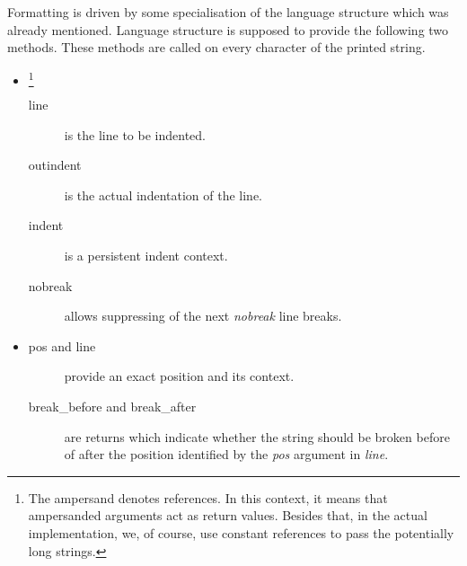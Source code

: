 Formatting is driven by some specialisation of the language structure which was already mentioned. Language structure is supposed to provide the following two methods. These methods are called on every character of the printed string.
\begin{itemize}
  \item {}\footnote{The ampersand denotes references. In this context, it means that ampersanded arguments act as return values. Besides that, in the actual implementation, we, of course, use constant references to pass the potentially long strings.}
	\begin{description}
	  \item[line] is the line to be indented. 
	  \item[outindent] is the actual indentation of the line.
	  \item[indent] is a persistent indent context.
	  \item[nobreak] allows suppressing of the next \emph{nobreak} line breaks.
	\end{description}
  \item {}
	\begin{description}
	  \item[pos and line] provide an exact position and its context.
	  \item[break\_before and break\_after] are returns which indicate whether the string should be broken before of after the position identified by the \emph{pos} argument in \emph{line}.
	\end{description}
\end{itemize}




